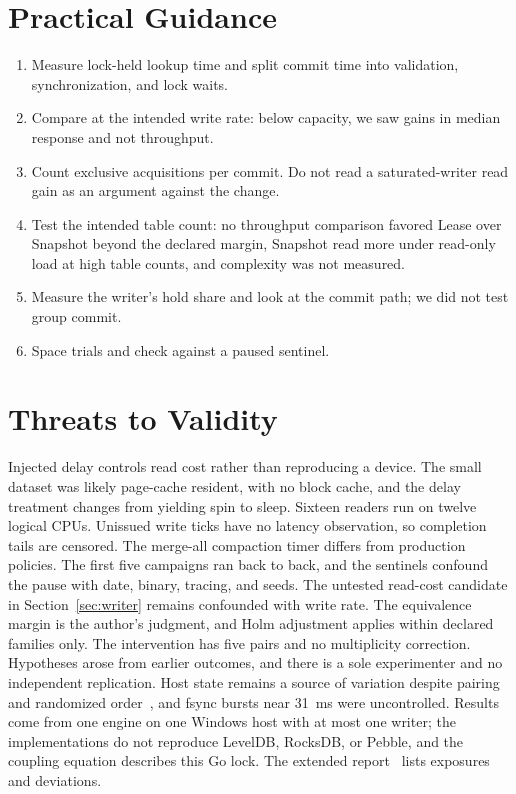 \documentclass[conference]{IEEEtran}
\begin{document}
\section{Practical Guidance}
\begin{enumerate}
\item Measure lock-held lookup time and split commit time into validation, synchronization, and lock waits.
\item Compare at the intended write rate: below capacity, we saw gains in median response and not throughput.
\item Count exclusive acquisitions per commit. Do not read a saturated-writer read gain as an argument against the change.
\item Test the intended table count: no throughput comparison favored Lease over Snapshot beyond the declared margin, Snapshot read more under read-only load at high table counts, and complexity was not measured.
\item Measure the writer's hold share and look at the commit path; we did not test group commit.
\item Space trials and check against a paused sentinel.
\end{enumerate}

\section{Threats to Validity}
Injected delay controls read cost rather than reproducing a device. The small dataset was likely page-cache resident, with no block cache, and the delay treatment changes from yielding spin to sleep. Sixteen readers run on twelve logical CPUs. Unissued write ticks have no latency observation, so completion tails are censored. The merge-all compaction timer differs from production policies. The first five campaigns ran back to back, and the sentinels confound the pause with date, binary, tracing, and seeds. The untested read-cost candidate in Section~\ref{sec:writer} remains confounded with write rate. The equivalence margin is the author's judgment, and Holm adjustment applies within declared families only. The intervention has five pairs and no multiplicity correction. Hypotheses arose from earlier outcomes, and there is a sole experimenter and no independent replication. Host state remains a source of variation despite pairing and randomized order~\cite{mytkowicz2009}, and fsync bursts near 31~ms were uncontrolled. Results come from one engine on one Windows host with at most one writer; the implementations do not reproduce LevelDB, RocksDB, or Pebble, and the coupling equation describes this Go lock. The extended report~\cite{extended} lists exposures and deviations.
\end{document}
